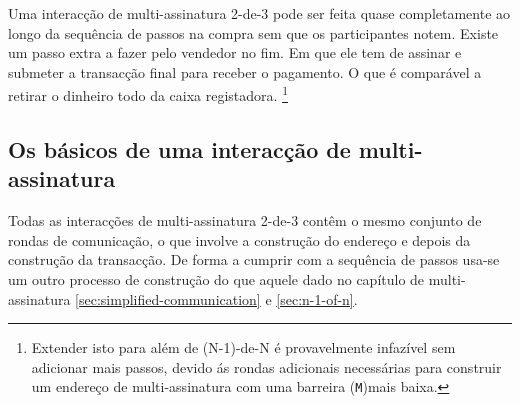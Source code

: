 Uma interacção de multi-assinatura 2-de-3 pode ser feita quase completamente ao longo da sequência de passos na compra sem que os participantes notem. Existe um passo extra a fazer pelo vendedor no fim. Em que ele tem de assinar e submeter a transacção final para receber o pagamento. O que é comparável a retirar o dinheiro todo da caixa registadora.  
\footnote{Extender isto para além de (N-1)-de-N é provavelmente infazível sem adicionar mais passos, devido ás rondas adicionais necessárias para construir um endereço de multi-assinatura com uma barreira ({\tt M})mais baixa.}


\subsection{Os básicos de uma interacção de multi-assinatura}
\label{subsec:escrowed-marketplace-multisig-interaction-basics}

Todas as interacções de multi-assinatura 2-de-3 contêm o mesmo conjunto de rondas de comunicação, o que involve a construção do endereço e depois da construção da transacção. De forma a cumprir com a sequência de passos usa-se um outro processo de construção do que aquele dado no capítulo de multi-assinatura \ref{sec:simplified-communication} e \ref{sec:n-1-of-n}. 

